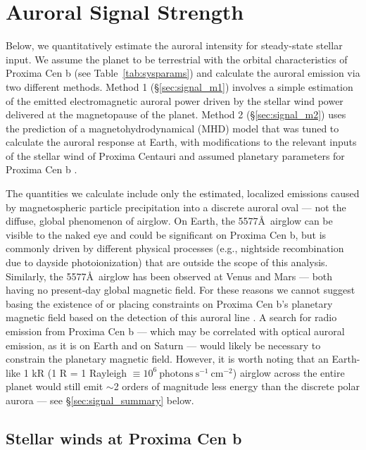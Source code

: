 \documentclass{emulateapj}
\begin{document}
\section{Auroral Signal Strength}
\label{sec:signal}

Below, we quantitatively estimate the auroral intensity for steady-state stellar input. We assume the planet to be terrestrial with the orbital characteristics of Proxima Cen b (see Table~\ref{tab:sysparams}) and calculate the auroral emission via two different methods. Method 1 (\S\ref{sec:signal_m1}) involves a simple estimation of the emitted electromagnetic auroral power driven by the stellar wind power delivered at the magnetopause of the planet. Method 2 (\S\ref{sec:signal_m2}) uses the prediction of a magnetohydrodynamical (MHD) model that was tuned to calculate the auroral response at Earth, with modifications to the relevant inputs of the stellar wind of Proxima Centauri and assumed planetary parameters for Proxima Cen b \citep{Anglada-Escude2016}. 

The quantities we calculate include only the estimated, localized emissions caused by magnetospheric particle precipitation into a discrete auroral oval --- not the diffuse, global phenomenon of airglow. On Earth, the 5577\AA\ airglow can be visible to the naked eye and could be significant on Proxima Cen b, but is commonly driven by different physical processes (e.g., nightside recombination due to dayside photoionization) that are outside the scope of this analysis. Similarly, the 5577\AA\ airglow has been observed at Venus \citep[e.g.][]{Slanger2001} and Mars \citep[e.g.][]{Seth2002} --- both having no present-day global magnetic field. For these reasons we cannot suggest basing the existence of or placing constraints on Proxima Cen b's planetary magnetic field based on the detection of this auroral line \citep[see, for instance,][]{Griessmeier2015}. A search for radio emission from Proxima Cen b --- which may be correlated with optical auroral emission, as it is on Earth and on Saturn \citep{Kurth2005} --- would likely be necessary to constrain the planetary magnetic field. However, it is worth noting that an Earth-like 1 kR (1 R = 1 Rayleigh $\equiv 10^{6}\ \mathrm{photons\ s^{-1}\ cm^{-2}}$) airglow across the entire planet would still emit $\sim$2 orders of magnitude less energy than the discrete polar aurora --- see \S\ref{sec:signal_summary} below.

\subsection{Stellar winds at Proxima Cen b}
\label{sec:stellar_winds}
\end{document}
